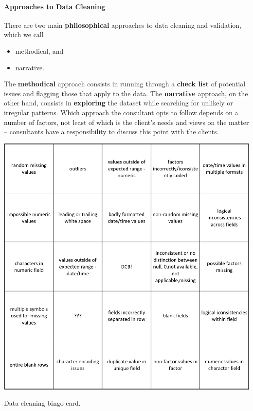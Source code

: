 \paragraph{Approaches to Data Cleaning}
There are two main \textbf{philosophical} approaches to data cleaning and validation, which we call
\begin{itemize}[noitemsep]
\item methodical, and 
\item narrative.
\end{itemize}
\newpage\noindent The \textbf{methodical} approach consists in running through a \textbf{check list} of potential issues and flagging those that apply to the data.
The \textbf{narrative} approach, on the other hand, consists in \textbf{exploring} the dataset while searching for unlikely or irregular patterns. Which approach the consultant opts to follow depends on a number of factors, not least of which is the client's needs and views  on the matter -- consultants have a responsibility to discuss this point with the clients.
\begin{table}[t]
\centering
\includegraphics[width=\textwidth]{images/DP/bingo.png}
\caption{\small Data cleaning bingo card.} \label{fig:bingo}
\end{table}
\afterpage{\FloatBarrier}
